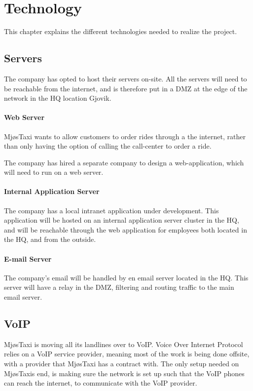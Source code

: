 \chapter{Technology} %
\label{chap:technology}


This chapter explains the different technologies needed to realize the project.

\section{Servers}
The company has opted to host their servers on-site.
All the servers will need to be reachable from the internet, and is therefore put in a DMZ at the edge of the network in the HQ location Gjovik.

\subsubsection{Web Server}
MjøsTaxi wants to allow customers to order rides through a the internet, rather than only having the option of calling the call-center to order a ride.

The company has hired a separate company to design a web-application, which will need to run on a web server.

\subsubsection{Internal Application Server}
The company has a local intranet application under development. This application will be hosted on an internal application server cluster in the HQ, and will be reachable through the web application for employees both located in the HQ, and from the outside. %

\subsubsection{E-mail Server}
The company's email will be handled by en email server located in the HQ.
This server will have a relay in the DMZ, filtering and routing traffic to the main email server.


\section{VoIP}
MjøsTaxi is moving all its landlines over to VoIP.
Voice Over Internet Protocol relies on a VoIP service provider, meaning most of the work is being done offsite, with a provider that MjøsTaxi has a contract with. \cite{VoIP} 
The only setup needed on MjøsTaxis end, is making sure the network is set up such that the VoIP phones can reach the internet, to communicate with the VoIP provider.

